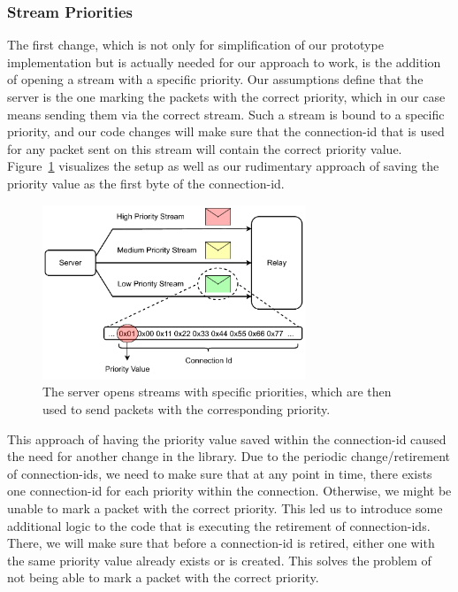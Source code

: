 \subsubsection*{Stream Priorities}
The first change, which is not only for simplification of our prototype implementation but is actually needed for 
our approach to work, is the addition of opening a stream with a specific priority.
Our assumptions define that the server is the one marking the packets with the correct priority, which in 
our case means sending them via the correct stream.
Such a stream is bound to a specific priority, and our code changes will make sure that the connection-id
that is used for any packet sent on this stream will contain the correct priority value.
Figure~\ref{fig:priority-stream} visualizes the setup as well as our rudimentary approach of saving the 
priority value as the first byte of the connection-id.

\vspace{0.5cm}
\begin{figure}[H]
    \centering
    \includegraphics[width=0.7\textwidth]{figures/03_fast_relays/priority-streams.drawio.pdf}
    \caption[Streams with specific priorities]{The server opens streams with specific priorities, 
    which are then used to send packets with the corresponding priority.}\label{fig:priority-stream}
\end{figure}

This approach of having the priority value saved within the connection-id caused the need for another 
change in the library.
Due to the periodic change/retirement of connection-ids, we need to make sure that at any point in time, there 
exists one connection-id for each priority within the connection.
Otherwise, we might be unable to mark a packet with the correct priority.
This led us to introduce some additional logic to the code that is executing the retirement of connection-ids.
There, we will make sure that before a connection-id is retired, either one with the same priority value
already exists or is created.
This solves the problem of not being able to mark a packet with the correct priority.

